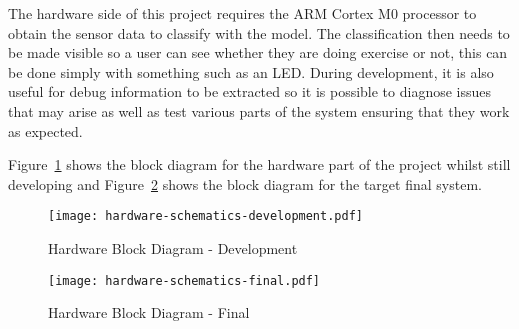 
The hardware side of this project requires the ARM Cortex M0 processor to obtain the sensor data to classify with the model. The classification then needs to be made visible so a user can see whether they are doing exercise or not, this can be done simply with something such as an LED. During development, it is also useful for debug information to be extracted so it is possible to diagnose issues that may arise as well as test various parts of the system ensuring that they work as expected. 

Figure~\ref{fig:hardware_schematic_development} shows the block diagram for the hardware part of the project whilst still developing and Figure~\ref{fig:hardware_schematic_final} shows the block diagram for the target final system.

\begin{figure}
	\centering
	\texttt{[image: hardware-schematics-development.pdf]}
	\caption{Hardware Block Diagram - Development}
	\label{fig:hardware_schematic_development}
\end{figure}

\begin{figure}
	\centering
	\texttt{[image: hardware-schematics-final.pdf]}
	\caption{Hardware Block Diagram - Final}
	\label{fig:hardware_schematic_final}
\end{figure}
